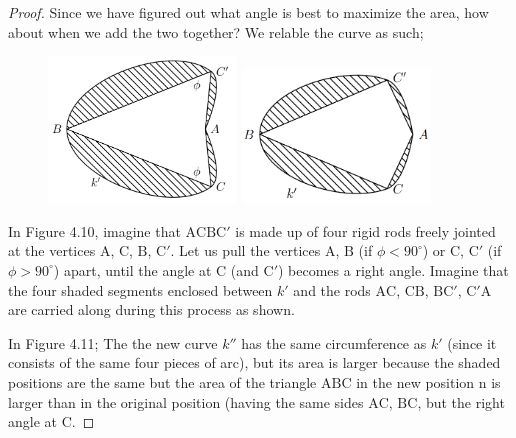 \documentclass[a4paper]{book}
\numberwithin{theorem}{section}%
\begin{document}
\begin{proof}
    Since we have figured out what angle is best to maximize the area, how about when we add the two together? We relable the curve as such;
    \begin{figure} [hbt!]
        \centering
        \begin{minipage}{0.5\textwidth}
            \centering
            \includegraphics[width=50mm]{Steiner4} %
            \caption{}
        \end{minipage}\hfill
        \begin{minipage}{0.5\textwidth}
            \centering
            \includegraphics[width=50mm]{Steiner5} %
            \caption{}
        \end{minipage}
    \end{figure}\leavevmode\newline
    In Figure 4.10, imagine that $\mathrm{ACBC}'$ is made up of four rigid rods freely jointed at the vertices $\mathrm{A}$, $\mathrm{C}$, $\mathrm{B}$, $\mathrm{C}'$. Let us pull the vertices $\mathrm{A}$, $\mathrm{B}$ (if $\phi<90^{\circ}$) or $\mathrm{C}$, $\mathrm{C}'$ (if $\phi>90^{\circ}$) apart, until the angle at $\mathrm{C}$ (and $\mathrm{C}'$) becomes a right angle. Imagine that the four shaded segments enclosed between $k'$ and the rods $\mathrm{AC}$, $\mathrm{CB}$, $\mathrm{BC}'$, $\mathrm{C}'\mathrm{A}$ are carried along during this process as shown.

    In Figure 4.11; The the new curve $k''$ has the same circumference as $k'$ (since it consists of the same four pieces of arc), but its area is larger because the shaded positions are the same but the area of the triangle $\mathrm{ABC}$ in the new position n is larger than in the original position (having the same sides $\mathrm{AC}$, $\mathrm{BC}$, but the right angle at $\mathrm{C}$.


\end{proof}
\end{document}
